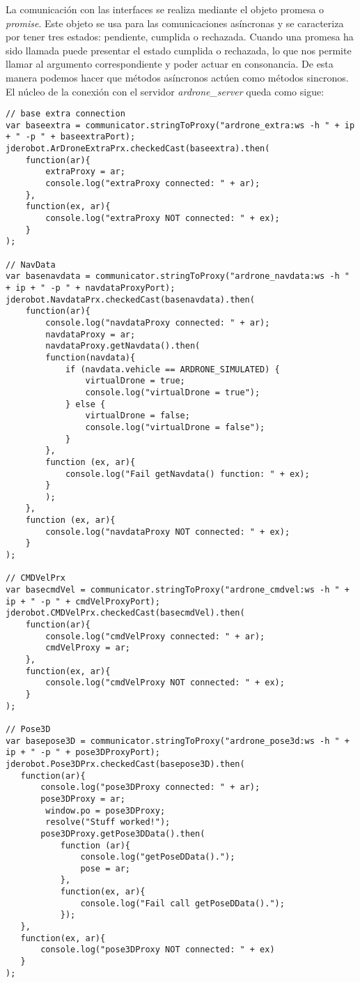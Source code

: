 La comunicación con las interfaces se realiza mediante el objeto promesa o \emph{promise}. Este objeto se usa para las comunicaciones asíncronas y se caracteriza por tener tres estados: pendiente, cumplida o rechazada. Cuando una promesa ha sido llamada puede presentar el estado cumplida o rechazada, lo que nos permite llamar al argumento correspondiente y poder actuar en consonancia. De esta manera podemos hacer que métodos asíncronos actúen como métodos sincronos.\\

El núcleo de la conexión con el servidor \emph{ardrone\_server} queda como sigue:\\

\begin{lstlisting}[caption=Nucleo ArDrone]
// base extra connection
var baseextra = communicator.stringToProxy("ardrone_extra:ws -h " + ip + " -p " + baseextraPort);
jderobot.ArDroneExtraPrx.checkedCast(baseextra).then(
    function(ar){
        extraProxy = ar;
        console.log("extraProxy connected: " + ar);
    },
    function(ex, ar){
        console.log("extraProxy NOT connected: " + ex);
    }
);               

// NavData
var basenavdata = communicator.stringToProxy("ardrone_navdata:ws -h " + ip + " -p " + navdataProxyPort);
jderobot.NavdataPrx.checkedCast(basenavdata).then(
    function(ar){
        console.log("navdataProxy connected: " + ar);
        navdataProxy = ar;
        navdataProxy.getNavdata().then(
        function(navdata){
            if (navdata.vehicle == ARDRONE_SIMULATED) {
                virtualDrone = true;
                console.log("virtualDrone = true");
            } else {
                virtualDrone = false;
                console.log("virtualDrone = false");
            }
        },
        function (ex, ar){
            console.log("Fail getNavdata() function: " + ex);
        }
        );
    },
    function (ex, ar){
        console.log("navdataProxy NOT connected: " + ex);
    }        
);        

// CMDVelPrx
var basecmdVel = communicator.stringToProxy("ardrone_cmdvel:ws -h " + ip + " -p " + cmdVelProxyPort);
jderobot.CMDVelPrx.checkedCast(basecmdVel).then(
    function(ar){
        console.log("cmdVelProxy connected: " + ar);
        cmdVelProxy = ar;
    },
    function(ex, ar){
        console.log("cmdVelProxy NOT connected: " + ex);
    }
);             

// Pose3D
var basepose3D = communicator.stringToProxy("ardrone_pose3d:ws -h " + ip + " -p " + pose3DProxyPort);
jderobot.Pose3DPrx.checkedCast(basepose3D).then(
   function(ar){
       console.log("pose3DProxy connected: " + ar);
       pose3DProxy = ar;
        window.po = pose3DProxy;
        resolve("Stuff worked!");
       pose3DProxy.getPose3DData().then(
           function (ar){
               console.log("getPoseDData().");
               pose = ar;
           },
           function(ex, ar){
               console.log("Fail call getPoseDData().");
           });
   },
   function(ex, ar){
       console.log("pose3DProxy NOT connected: " + ex)
   }
);
\end{lstlisting}

